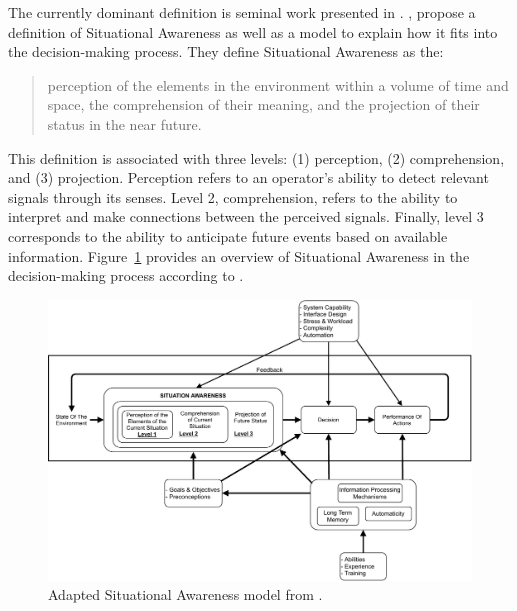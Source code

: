The currently dominant definition is seminal work presented in \parencite{endsleyTheorySituationAwareness1995}.
\citeauthor{endsleyTheorySituationAwareness1995}, propose a definition of Situational Awareness as well as a model to explain how it fits into the decision-making process.
They define Situational Awareness as the:
\blockquote{perception of the elements in the environment within a volume of time and space, the comprehension of their meaning, and the projection of their status in the near future.}
This definition is associated with three levels: (1) perception, (2) comprehension, and (3) projection.
Perception refers to an operator's ability to detect relevant signals through its senses.
Level 2, comprehension, refers to the ability to interpret and make connections between the perceived signals.
Finally, level 3 corresponds to the ability to anticipate future events based on available information.
Figure~\ref{information:SA} provides an overview of Situational Awareness in the decision-making process according to \parencite{endsleyTheorySituationAwareness1995}.

\begin{figure}[htb]
    \centering
    \includegraphics[width=\textwidth]{figures/chap-3/Endsley-1995.pdf}
    \caption{Adapted Situational Awareness model from \textcite{endsleyTheorySituationAwareness1995}.}
    \label{information:SA}
\end{figure}

